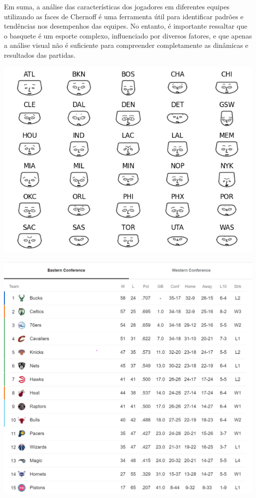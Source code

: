 \documentclass[
]{book}
\begin{document}
Em suma, a análise das características dos jogadores em diferentes equipes utilizando as faces de Chernoff é uma ferramenta útil para identificar padrões e tendências nos desempenhos das equipes. No entanto, é importante ressaltar que o basquete é um esporte complexo, influenciado por diversos fatores, e que apenas a análise visual não é suficiente para compreender completamente as dinâmicas e resultados das partidas.

\includegraphics{imagens/20.png}

\includegraphics{imagens/21.jpeg}
\end{document}
